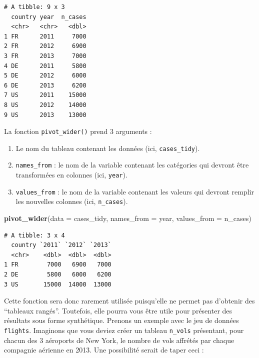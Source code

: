 \documentclass[
  a4paper,
]{article}
\newenvironment{Shaded}{\begin{snugshade}}{\end{snugshade}}
\newcommand{\DataTypeTok}[1]{\textcolor[rgb]{0.00,0.34,0.68}{#1}}
\newcommand{\KeywordTok}[1]{\textcolor[rgb]{0.12,0.11,0.11}{\textbf{#1}}}
\newcommand{\NormalTok}[1]{\textcolor[rgb]{0.12,0.11,0.11}{#1}}
\newcommand{\OperatorTok}[1]{\textcolor[rgb]{0.12,0.11,0.11}{#1}}
\newcommand{\StringTok}[1]{\textcolor[rgb]{0.75,0.01,0.01}{#1}}
\providecommand{\tightlist}{%
  \setlength{\itemsep}{0pt}\setlength{\parskip}{0pt}}
\begin{document}
\begin{verbatim}
# A tibble: 9 x 3
  country year  n_cases
  <chr>   <chr>   <dbl>
1 FR      2011     7000
2 FR      2012     6900
3 FR      2013     7000
4 DE      2011     5800
5 DE      2012     6000
6 DE      2013     6200
7 US      2011    15000
8 US      2012    14000
9 US      2013    13000
\end{verbatim}

La fonction \texttt{pivot\_wider()} prend 3 arguments :

\begin{enumerate}
\def\labelenumi{\arabic{enumi}.}
\tightlist
\item
  Le nom du tableau contenant les données (ici, \texttt{cases\_tidy}).
\item
  \texttt{names\_from} : le nom de la variable contenant les catégories qui devront être transformées en colonnes (ici, \texttt{year}).
\item
  \texttt{values\_from} : le nom de la variable contenant les valeurs qui devront remplir les nouvelles colonnes (ici, \texttt{n\_cases}).
\end{enumerate}

\begin{Shaded}
\begin{Highlighting}[]
\KeywordTok{pivot_wider}\NormalTok{(}\DataTypeTok{data =}\NormalTok{ cases_tidy, }
            \DataTypeTok{names_from =}\NormalTok{ year, }
            \DataTypeTok{values_from =}\NormalTok{ n_cases)}
\end{Highlighting}
\end{Shaded}

\begin{verbatim}
# A tibble: 3 x 4
  country `2011` `2012` `2013`
  <chr>    <dbl>  <dbl>  <dbl>
1 FR        7000   6900   7000
2 DE        5800   6000   6200
3 US       15000  14000  13000
\end{verbatim}

Cette fonction sera donc rarement utilisée puisqu'elle ne permet pas d'obtenir des ``tableaux rangés''. Toutefois, elle pourra vous être utile pour présenter des résultats sous forme synthétique. Prenons un exemple avec le jeu de données \texttt{flights}. Imaginons que vous deviez créer un tableau \texttt{n\_vols} présentant, pour chacun des 3 aéroports de New York, le nombre de vols affrétés par chaque compagnie aérienne en 2013. Une possibilité serait de taper ceci :

\begin{Shaded}
\end{Shaded}
\end{document}
